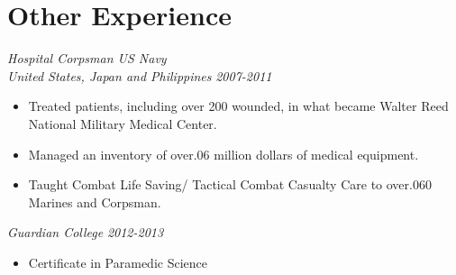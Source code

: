 \documentclass[letterpaper]{article}
\begin{document}
\section*{Other Experience}
\begin{multicols}{2}
\textit{Hospital Corpsman US Navy
\\United States, Japan and Philippines}
\vfill
\columnbreak
\textit{2007-2011}
\end{multicols}
\begin{itemize}
    \item Treated patients, including over 200 wounded, in what became Walter Reed National Military Medical Center.
    \item Managed an inventory of over.06 million dollars of medical equipment.
    \item Taught Combat Life Saving/ Tactical Combat Casualty Care to over.060 Marines and Corpsman. 
\end{itemize}

\begin{multicols}{2}
\textit{Guardian College}
\vfill
\columnbreak
\textit{2012-2013}
\end{multicols}
\begin{itemize}
      \item Certificate in Paramedic Science 
\end{itemize}
\end{document}
